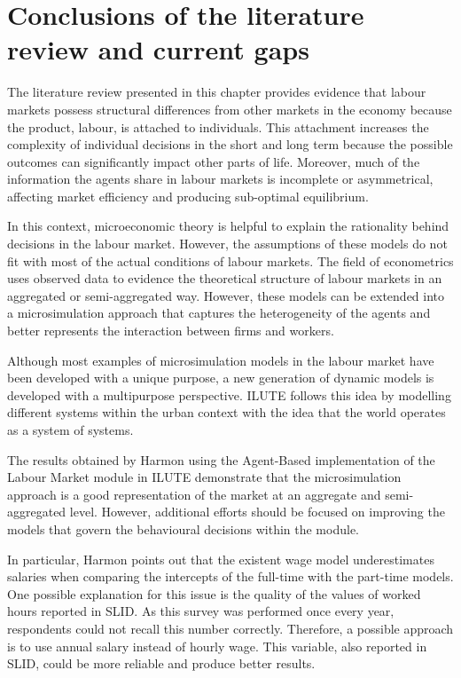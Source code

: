 \section{Conclusions of the literature review and current gaps} 

The literature review presented in this chapter provides evidence that labour markets possess structural differences from other markets in the economy because the product, labour, is attached to individuals. This attachment increases the complexity of individual decisions in the short and long term because the possible outcomes can significantly impact other parts of life. Moreover, much of the information the agents share in labour markets is incomplete or asymmetrical, affecting market efficiency and producing sub-optimal equilibrium. 

In this context, microeconomic theory is helpful to explain the rationality behind decisions in the labour market. However, the assumptions of these models do not fit with most of the actual conditions of labour markets. The field of econometrics uses observed data to evidence the theoretical structure of labour markets in an aggregated or semi-aggregated way. However, these models can be extended into a microsimulation approach that captures the heterogeneity of the agents and better represents the interaction between firms and workers. 

Although most examples of microsimulation models in the labour market have been developed with a unique purpose, a new generation of dynamic models is developed with a multipurpose perspective. ILUTE follows this idea by modelling different systems within the urban context with the idea that the world operates as a system of systems. 

The results obtained by Harmon using the Agent-Based implementation of the Labour Market module in ILUTE demonstrate that the microsimulation approach is a good representation of the market at an aggregate and semi-aggregated level. However, additional efforts should be focused on improving the models that govern the behavioural decisions within the module. 

In particular, Harmon points out that the existent wage model underestimates salaries when comparing the intercepts of the full-time with the part-time models. One possible explanation for this issue is the quality of the values of worked hours reported in SLID. As this survey was performed once every year, respondents could not recall this number correctly. Therefore, a possible approach is to use annual salary instead of hourly wage. This variable, also reported in SLID, could be more reliable and produce better results. 

